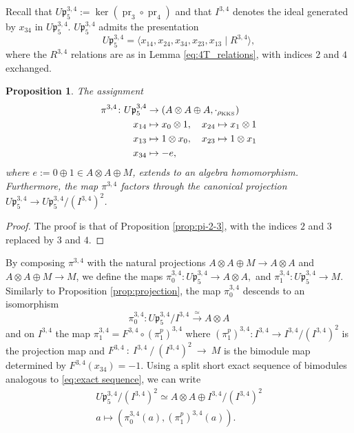 \documentclass[a4paper,fleqn]{cas-sc}
\newtheorem{proposition}[theorem]{Proposition}
\DeclareMathOperator{\pr}{pr}
\begin{document}
Recall that $U\mathfrak{p}^{3,4}_5:=\ker (\pr_3\circ \pr_4)$ and that $I^{3,4}$ denotes the ideal generated by $x_{34}$ in $U\mathfrak{p}_5^{3,4}$. $U\mathfrak{p}^{3,4}_5$ admits the presentation
$$
	U\mathfrak{p}^{3,4}_5=\langle x_{14},x_{24},x_{34},x_{23},x_{13} \mid R^{3,4} \rangle,
$$
where the $R^{3,4}$ relations are as in Lemma \ref{eq:4T_relations}, with indices $2$ and $4$ exchanged.

\begin{proposition}
	The assignment
	\begin{align*}
		\pi^{3,4} \colon U\mathfrak{p}^{3,4}_5 &\to (A \otimes A \oplus A, \cdot_{\rho_{\rm{KKS}}}) \\
		x_{14} &\mapsto x_0 \otimes 1, \quad x_{24}\mapsto x_1\otimes 1  \\
		x_{13} &\mapsto 1 \otimes x_0,\quad x_{23}\mapsto 1\otimes x_1 \\
		x_{34} &\mapsto -e,
	\end{align*}
	where $e := 0 \oplus 1 \in A \otimes A \oplus M$, extends to an algebra homomorphism. Furthermore, the map $\pi^{3,4}$ factors through the canonical projection $U\mathfrak{p}^{3,4}_5 \to U\mathfrak{p}^{3,4}_5 /(I^{3,4})^2$.
\end{proposition}	

\begin{proof}
    The proof is that of Proposition \ref{prop:pi-2-3}, with the indices $2$ and $3$ replaced by $3$ and $4$.
\end{proof}

By composing $\pi^{3,4}$ with the natural projections 
$A \otimes A \oplus M \to A \otimes A$ and $A \otimes A \oplus M \to  M$, we define the maps
%
$
\pi^{3,4}_0 \colon U\mathfrak{p}^{3,4}_5 \to A \otimes A, 
$ and 
$
\pi^{3,4}_1 \colon U\mathfrak{p}^{3,4}_5 \to M.
$
Similarly to Proposition \ref{prop:projection}, the map $\pi^{3,4}_0$ descends to an isomorphism 
$$
        \pi^{3,4}_0:U\mathfrak{p}_5^{3,4}/I^{3,4} \overset{\simeq}{\longrightarrow} A\otimes A
$$
and on $I^{3,4}$ the map $\pi^{3,4}_1=F^{3,4}\circ (\pi^p_1)^{3,4}$ where $(\pi^p_1)^{3,4}:I^{3,4}\to I^{3,4}/(I^{3,4})^2$ is the projection map and $F^{3,4}~:~I^{3,4}~/~(I^{3,4})^2~\to~M$ is the bimodule map determined by $F^{3,4}(x_{34})=-1.$ Using a split short exact sequence of bimodules analogous to \eqref{eq:exact sequence}, we can write
\begin{equation*}
\begin{split}
    	U\mathfrak{p}^{3,4}_5/(I^{3,4})^2 \simeq A\otimes A\oplus I^{3,4}/(I^{3,4})^2\\
        a\mapsto (\pi^{3,4}_0(a),(\pi^p_1)^{3,4}(a)).
\end{split}
\end{equation*}
\end{document}
